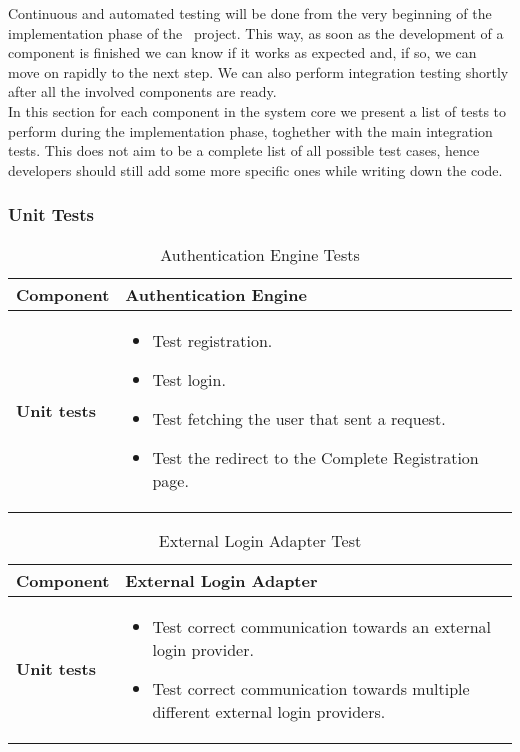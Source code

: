 Continuous and automated testing will be done from the very beginning of the implementation phase of the \projectname~project. This way, as soon as the development of a component is finished we can know if it works as expected and, if so, we can move on rapidly to the next step. We can also perform integration testing shortly after all the involved components are ready. \\
In this section for each component in the system core we present a list of tests to perform during the implementation phase, toghether with the main integration tests. This does not aim to be a complete list of all possible test cases, hence developers should still add some more specific ones while writing down the code. \\

\subsubsection{Unit Tests}

\begin{table}[H]	
	\centering
	\def\arraystretch{1.5}
	\begin{tabular}{|m{4cm}|m{12cm}|}
		\hline
		\textbf{Component} & Authentication Engine \\ \hline
		\textbf{Unit tests} & 
			\begin{itemize}
			\item Test registration.
			\item Test login.
			\item Test fetching the user that sent a request.
			\item Test the redirect to the Complete Registration page.
			\end{itemize} \\ \hline
	\end{tabular}
	\caption{Authentication Engine Tests}
\end{table}

\begin{table}[H]	
	\centering
	\def\arraystretch{1.5}
	\begin{tabular}{|m{4cm}|m{12cm}|}
		\hline
		\textbf{Component} & External Login Adapter \\ \hline
		\textbf{Unit tests} & 
			\begin{itemize}
			\item Test correct communication towards an external login provider.
			\item Test correct communication towards multiple different external login providers.
			\end{itemize} \\ \hline
	\end{tabular}
	\caption{External Login Adapter Test}
\end{table}

